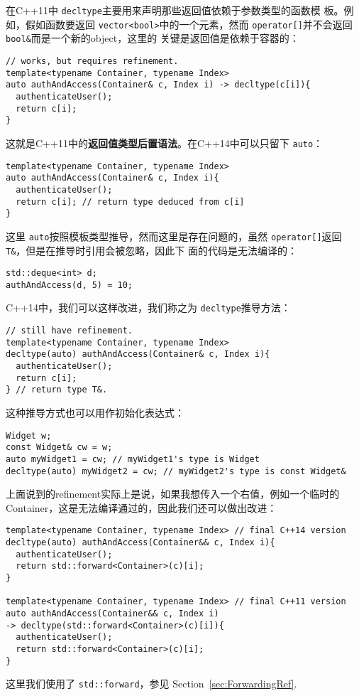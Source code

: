 \message{ !name(../CppLearning.tex)}\documentclass[a4paper,twoside]{article}
\theoremstyle{definition}
\theoremstyle{remark}
\numberwithin{equation}{section}
\let\OldTexttt\texttt
\renewcommand{\texttt}[1]{{\color{blue} \OldTexttt{#1}}}
\begin{document}
在C++11中\texttt{decltype}主要用来声明那些返回值依赖于参数类型的函数模
板。例如，假如函数要返回\texttt{vector<bool>}中的一个元素，然而
\texttt{operator[]}并不会返回\texttt{bool\&}而是一个新的object，这里的
关键是返回值是依赖于容器的：
\begin{verbatim}
// works, but requires refinement.
template<typename Container, typename Index> 
auto authAndAccess(Container& c, Index i) -> decltype(c[i]){
  authenticateUser();
  return c[i];
}
\end{verbatim}
这就是C++11中的\textbf{返回值类型后置语法}。在C++14中可以只留下
\texttt{auto}：
\begin{verbatim}
template<typename Container, typename Index>
auto authAndAccess(Container& c, Index i){
  authenticateUser();
  return c[i]; // return type deduced from c[i]
}
\end{verbatim}

这里\texttt{auto}按照模板类型推导，然而这里是存在问题的，虽然
\texttt{operator[]}返回\texttt{T\&}，但是在推导时引用会被忽略，因此下
面的代码是无法编译的：
\begin{verbatim}
std::deque<int> d;
authAndAccess(d, 5) = 10; 
\end{verbatim}

C++14中，我们可以这样改进，我们称之为\texttt{decltype}推导方法：
\begin{verbatim}
// still have refinement.
template<typename Container, typename Index> 
decltype(auto) authAndAccess(Container& c, Index i){
  authenticateUser();
  return c[i];
} // return type T&.
\end{verbatim}

这种推导方式也可以用作初始化表达式：
\begin{verbatim}
Widget w;
const Widget& cw = w;
auto myWidget1 = cw; // myWidget1's type is Widget
decltype(auto) myWidget2 = cw; // myWidget2's type is const Widget&
\end{verbatim}

上面说到的refinement实际上是说，如果我想传入一个右值，例如一个临时的
Container，这是无法编译通过的，因此我们还可以做出改进：

\begin{verbatim}
template<typename Container, typename Index> // final C++14 version
decltype(auto) authAndAccess(Container&& c, Index i){
  authenticateUser();
  return std::forward<Container>(c)[i];
}

template<typename Container, typename Index> // final C++11 version
auto authAndAccess(Container&& c, Index i)
-> decltype(std::forward<Container>(c)[i]){
  authenticateUser();
  return std::forward<Container>(c)[i];
}
\end{verbatim}
这里我们使用了\texttt{std::forward}，参见
Section~\ref{sec:ForwardingRef}.
\end{document}
